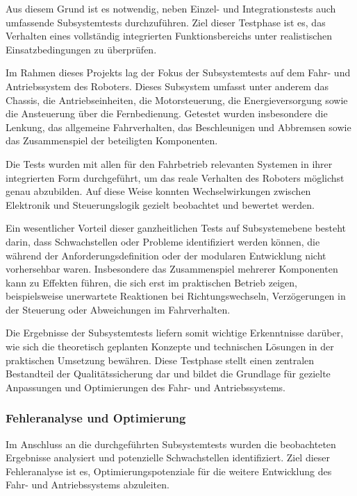 Aus diesem Grund ist es notwendig, neben Einzel- und Integrationstests auch umfassende Subsystemtests durchzuführen. Ziel dieser Testphase ist es, das Verhalten eines vollständig integrierten Funktionsbereichs unter realistischen Einsatzbedingungen zu überprüfen.

Im Rahmen dieses Projekts lag der Fokus der Subsystemtests auf dem Fahr- und Antriebssystem des Roboters. Dieses Subsystem umfasst unter anderem das Chassis, die Antriebseinheiten, die Motorsteuerung, die Energieversorgung sowie die Ansteuerung über die Fernbedienung. Getestet wurden insbesondere die Lenkung, das allgemeine Fahrverhalten, das Beschleunigen und Abbremsen sowie das Zusammenspiel der beteiligten Komponenten.

Die Tests wurden mit allen für den Fahrbetrieb relevanten Systemen in ihrer integrierten Form durchgeführt, um das reale Verhalten des Roboters möglichst genau abzubilden. Auf diese Weise konnten Wechselwirkungen zwischen Elektronik und Steuerungslogik gezielt beobachtet und bewertet werden.

Ein wesentlicher Vorteil dieser ganzheitlichen Tests auf Subsystemebene besteht darin, dass Schwachstellen oder Probleme identifiziert werden können, die während der Anforderungsdefinition oder der modularen Entwicklung nicht vorhersehbar waren. Insbesondere das Zusammenspiel mehrerer Komponenten kann zu Effekten führen, die sich erst im praktischen Betrieb zeigen, beispielsweise unerwartete Reaktionen bei Richtungswechseln, Verzögerungen in der Steuerung oder Abweichungen im Fahrverhalten.

Die Ergebnisse der Subsystemtests liefern somit wichtige Erkenntnisse darüber, wie sich die theoretisch geplanten Konzepte und technischen Lösungen in der praktischen Umsetzung bewähren. Diese Testphase stellt einen zentralen Bestandteil der Qualitätssicherung dar und bildet die Grundlage für gezielte Anpassungen und Optimierungen des Fahr- und Antriebssystems.

\subsubsection{Fehleranalyse und Optimierung}

Im Anschluss an die durchgeführten Subsystemtests wurden die beobachteten Ergebnisse analysiert und potenzielle Schwachstellen identifiziert. Ziel dieser Fehleranalyse ist es, Optimierungspotenziale für die weitere Entwicklung des Fahr- und Antriebssystems abzuleiten.

